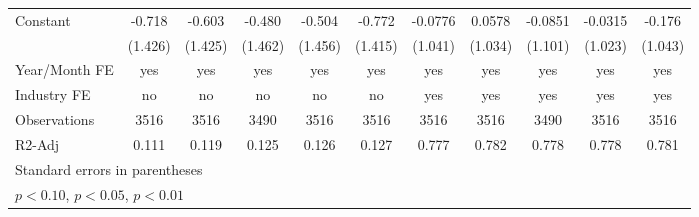 \begin{table}[htbp]
\begin{tabular}{l*{10}{c}}
Constant        &   -0.718         &   -0.603         &   -0.480         &   -0.504         &   -0.772         &  -0.0776         &   0.0578         &  -0.0851         &  -0.0315         &   -0.176         \\
                &  (1.426)         &  (1.425)         &  (1.462)         &  (1.456)         &  (1.415)         &  (1.041)         &  (1.034)         &  (1.101)         &  (1.023)         &  (1.043)         \\
Year/Month FE   &      yes         &      yes         &      yes         &      yes         &      yes         &      yes         &      yes         &      yes         &      yes         &      yes         \\
Industry FE     &       no         &       no         &       no         &       no         &       no         &      yes         &      yes         &      yes         &      yes         &      yes         \\
Observations    &     3516         &     3516         &     3490         &     3516         &     3516         &     3516         &     3516         &     3490         &     3516         &     3516         \\
R2-Adj          &    0.111         &    0.119         &    0.125         &    0.126         &    0.127         &    0.777         &    0.782         &    0.778         &    0.778         &    0.781         \\
\multicolumn{11}{l}{\footnotesize Standard errors in parentheses}\\
\multicolumn{11}{l}{\footnotesize \sym{*} \(p<0.10\), \sym{**} \(p<0.05\), \sym{***} \(p<0.01\)}\\
\end{tabular}
\end{table}

